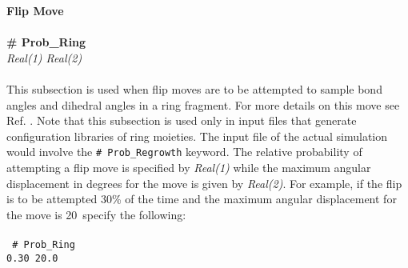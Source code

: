 %
%
%
%
%
%
%
{\bf Flip Move}\\ \\
{\bf \# Prob\_Ring} \\
{\it Real(1) Real(2)} \\ \\
%
This subsection is used when flip moves are to be attempted to sample bond angles and
dihedral angles in a ring fragment.
For more details on this move see Ref. \cite{Shah:2011}.
Note that this subsection is used only in input files
that generate configuration libraries of ring moieties. The input file of the
actual simulation would involve the \texttt{\# Prob\_Regrowth} keyword.
The relative probability of attempting a flip move is
specified by {\it Real(1)} while the maximum angular displacement
in degrees for the move is given by {\it Real(2)}.
For example, if the flip is to be attempted 30\% of the
time and the maximum angular displacement for the
move is 20\degree~specify the following: \\ \\
%
\texttt{
\# Prob\_Ring \\
0.30 20.0 \\ \\}
%
%
